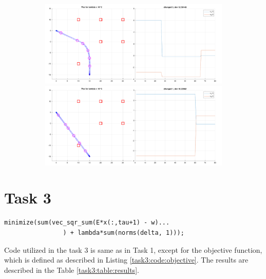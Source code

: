 \begin{figure}[!htb]
\begin{subfigure}
\end{subfigure}
\begin{subfigure}
    \centering
    \includegraphics[width=0.5\linewidth]{part1/figures/task2/2_2.pdf}\hspace{0em}
    \includegraphics[width=0.5\linewidth]{part1/figures/task2/2_3.pdf}
\end{subfigure}
\end{figure}

\section{Task 3}

\begin{lstlisting}[caption=Objective function used in Task 3., label=task3:code:objective, float=!htb]
minimize(sum(vec_sqr_sum(E*x(:,tau+1) - w)...
                ) + lambda*sum(norms(delta, 1)));
\end{lstlisting}

Code utilized in the task 3 is same as in Task 1, except for the objective function, which is defined as described in Listing \ref{task3:code:objective}. The results are described in the Table \ref{task3:table:results}.

